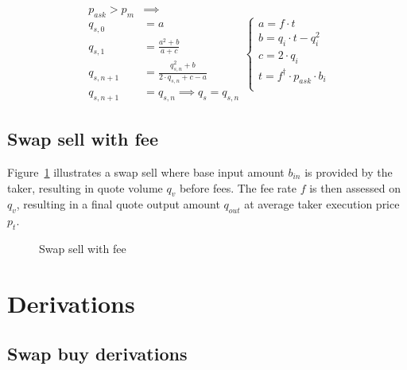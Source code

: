 \documentclass[table, twocolumn]{article}
\begin{document}
\begin{equation}\label{eqn:buy-with-fee-algorithm}
	\begin{aligned}
		p_{ask} > p_m & \implies                                          \\
		q_{s, 0}      & = a                                               \\
		q_{s, 1}      & = \frac{a^2 + b}{a + c}                           \\
		q_{s, n + 1}  & = \frac{q_{s, n}^2 + b}{2 \cdot q_{s, n} + c - a} \\
		q_{s, n + 1}  & = q_{s, n} \implies q_s = q_{s, n}
	\end{aligned}
	\begin{cases}
		a = f \cdot t                           \\
		b = q_i \cdot t - q_i ^ 2               \\
		c = 2 \cdot q_i                         \\
		t = f^{\dagger} \cdot p_{ask} \cdot b_i \\
	\end{cases}
\end{equation}

\subsection{Swap sell with fee}\label{ssec:swap-sell-with-fee}

Figure~\ref{fig:swap-sell-with-fee} illustrates a swap sell where base input amount
$b_{in}$ is provided by the taker, resulting in quote volume $q_v$ before fees. The fee
rate $f$ is then assessed on $q_v$, resulting in a final quote output amount $q_{out}$
at average taker execution price $p_t$.

\begin{figure}[!htb]
	\centering
	
	\caption{Swap sell with fee}\label{fig:swap-sell-with-fee}
\end{figure}

\section{Derivations}\label{sec:derivations}

\subsection{Swap buy derivations}\label{ssec:swap-buy-derivations}
\end{document}

